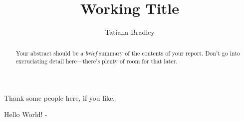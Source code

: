 \documentclass{scrippsthesis}
\title{Working Title}
\author{Tatiana Bradley}
\begin{document}
\test
\frontmatter
\maketitle



\begin{abstract}
  Your abstract should be a \emph{brief} summary of the contents of
  your report.  Don't go into excruciating detail here---there's
  plenty of room for that later.
\end{abstract}


\tableofcontents


\begin{acknowledgments}
 Thank some people here, if you like.
\end{acknowledgments}


\mainmatter

Hello World! - ~\cite{Example}


\backmatter

{}

\end{document}
